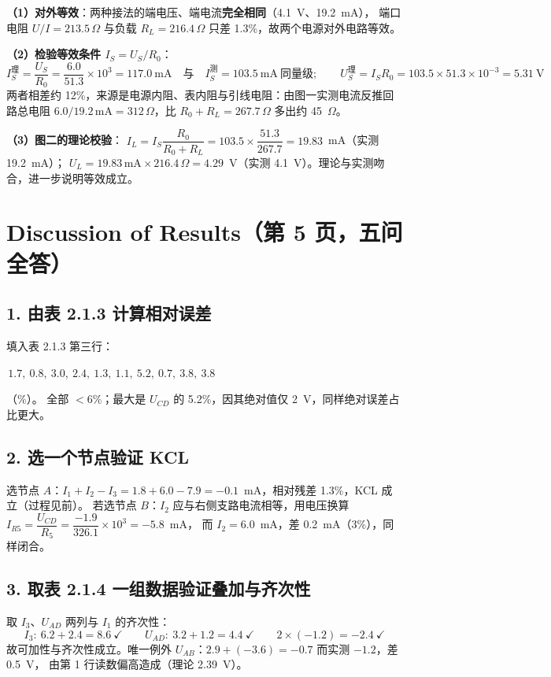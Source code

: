 \documentclass[UTF8,a4paper,10.5pt]{ctexart}
\newcommand{\key}[1]{\textbf{\color{acc}#1}}
\newcommand{\cw}[1]{\colorbox{soft}{\strut\,#1\,}}
\newcommand{\ok}[1]{\textcolor{okc}{#1}}
\begin{document}
\noindent\textbf{（1）对外等效}：两种接法的端电压、端电流\key{完全相同}（4.1~V、19.2~mA），
端口电阻 $U/I=213.5\,\Omega$ 与负载 $R_L=216.4\,\Omega$ 只差 1.3\%，故\ok{两个电源对外电路等效}。

\noindent\textbf{（2）检验等效条件 $I_S=U_S/R_0$}：
\[
I_S^{\text{理}}=\frac{U_S}{R_0}=\frac{6.0}{51.3}\times10^3=117.0\ \text{mA}
\quad\text{与}\quad I_S^{\text{测}}=103.5\ \text{mA}\ \text{同量级};\qquad
U_S^{\text{理}}=I_SR_0=103.5\times51.3\times10^{-3}=5.31\ \text{V}
\]
两者相差约 12\%，来源是电源内阻、表内阻与引线电阻：由图一实测电流反推回路总电阻
$6.0/19.2\,\text{mA}=312\,\Omega$，比 $R_0+R_L=267.7\,\Omega$ 多出约 45~$\Omega$。

\noindent\textbf{（3）图二的理论校验}：
$I_L=I_S\dfrac{R_0}{R_0+R_L}=103.5\times\dfrac{51.3}{267.7}=19.83$~mA（实测 19.2~mA）；
$U_L=19.83\,\text{mA}\times216.4\,\Omega=4.29$~V（实测 4.1~V）。理论与实测吻合，进一步说明等效成立。

\section{Discussion of Results（第 5 页，五问全答）}

\subsection*{1. 由表 2.1.3 计算相对误差}
填入表 2.1.3 第三行：
\cw{$1.7,\ 0.8,\ 3.0,\ 2.4,\ 1.3,\ 1.1,\ 5.2,\ 0.7,\ 3.8,\ 3.8$}（\%）。
全部 $<6\%$；最大是 $U_{CD}$ 的 5.2\%，因其绝对值仅 2~V，同样绝对误差占比更大。

\subsection*{2. 选一个节点验证 KCL}
选节点 $A$：$I_1+I_2-I_3=1.8+6.0-7.9=-0.1$~mA，相对残差 1.3\%，KCL 成立（过程见前）。
若选节点 $B$：$I_2$ 应与右侧支路电流相等，用电压换算
$I_{R5}=\dfrac{U_{CD}}{R_5}=\dfrac{-1.9}{326.1}\times10^3=-5.8$~mA，
而 $I_2=6.0$~mA，差 0.2~mA（3\%），同样闭合。

\subsection*{3. 取表 2.1.4 一组数据验证叠加与齐次性}
取 $I_3$、$U_{AD}$ 两列与 $I_1$ 的齐次性：
\[
I_3:\ 6.2+2.4=8.6\ \checkmark\qquad
U_{AD}:\ 3.2+1.2=4.4\ \checkmark\qquad
2\times(-1.2)=-2.4\ \checkmark
\]
故可加性与齐次性成立。唯一例外 $U_{AB}$：$2.9+(-3.6)=-0.7$ 而实测 $-1.2$，差 0.5~V，
由第 1 行读数偏高造成（理论 2.39~V）。
\end{document}

